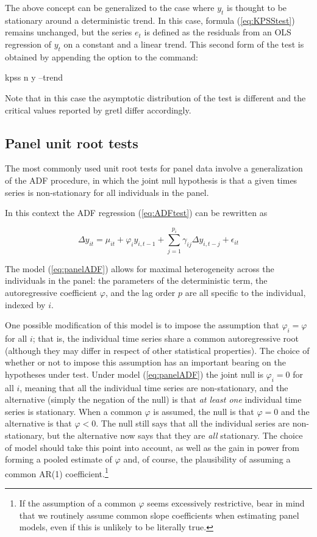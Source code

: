The above concept can be generalized to the case where $y_t$ is
thought to be stationary around a deterministic trend. In this case,
formula (\ref{eq:KPSStest}) remains unchanged, but the series $e_t$ is
defined as the residuals from an OLS regression of $y_t$ on a constant
and a linear trend. This second form of the test is obtained by
appending the  option to the  command:
\begin{code}
kpss n y --trend
\end{code}
Note that in this case the asymptotic distribution of the test is
different and the critical values reported by gretl differ
accordingly.


\subsection{Panel unit root tests}
\label{sec:panel-uroot}

The most commonly used unit root tests for panel data involve a
generalization of the ADF procedure, in which the joint null
hypothesis is that a given times series is non-stationary for all
individuals in the panel.

In this context the ADF regression (\ref{eq:ADFtest}) can be rewritten
as

\begin{equation}
  \label{eq:panelADF}
  \Delta y_{it} = \mu_{it} + \varphi_i y_{i,t-1} + \sum_{j=1}^{p_i} \gamma_{ij} \Delta
  y_{i,t-j} + \epsilon_{it}
\end{equation}

The model (\ref{eq:panelADF}) allows for maximal heterogeneity across
the individuals in the panel: the parameters of the deterministic
term, the autoregressive coefficient $\varphi$, and the lag order $p$
are all specific to the individual, indexed by $i$.

One possible modification of this model is to impose the assumption
that $\varphi_i = \varphi$ for all $i$; that is, the individual time
series share a common autoregressive root (although they may differ in
respect of other statistical properties). The choice of whether or not
to impose this assumption has an important bearing on the hypotheses
under test. Under model (\ref{eq:panelADF}) the joint null is
$\varphi_i = 0$ for all $i$, meaning that all the individual time
series are non-stationary, and the alternative (simply the negation of
the null) is that \emph{at least one} individual time series is
stationary.  When a common $\varphi$ is assumed, the null is that
$\varphi = 0$ and the alternative is that $\varphi < 0$. The null
still says that all the individual series are non-stationary, but the
alternative now says that they are \emph{all} stationary.  The choice
of model should take this point into account, as well as the gain in
power from forming a pooled estimate of $\varphi$ and, of course, the
plausibility of assuming a common AR(1) coefficient.\footnote{If the
  assumption of a common $\varphi$ seems excessively restrictive, bear
  in mind that we routinely assume common slope coefficients when
  estimating panel models, even if this is unlikely to be literally
  true.}

